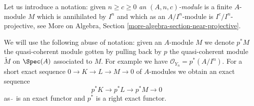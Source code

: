 \noindent
Let us introduce a notation: given $n \geq c \geq 0$
{\it an $(A, n, c)$-module}
is a finite $A$-module $M$ which is annihilated by $I^n$
and which as an $A/I^n$-module is $I^c/I^n$-projective, see
More on Algebra, Section \ref{more-algebra-section-near-projective}.

\medskip\noindent
We will use the following abuse of notation: given an $A$-module $M$
we denote $p^*M$ the quasi-coherent module gotten by pulling back by $p$
the quasi-coherent module $\widetilde{M}$ on $\Spec(A)$ associated to $M$.
For example we have $\mathcal{O}_{Y_n} = p^*(A/I^n)$.
For a short exact sequence $0 \to K \to L \to M \to 0$ of $A$-modules
we obtain an exact sequence
$$
p^*K \to p^*L \to p^*M \to 0
$$
as $\widetilde{\ }$ is an exact functor and $p^*$ is a right exact functor.

